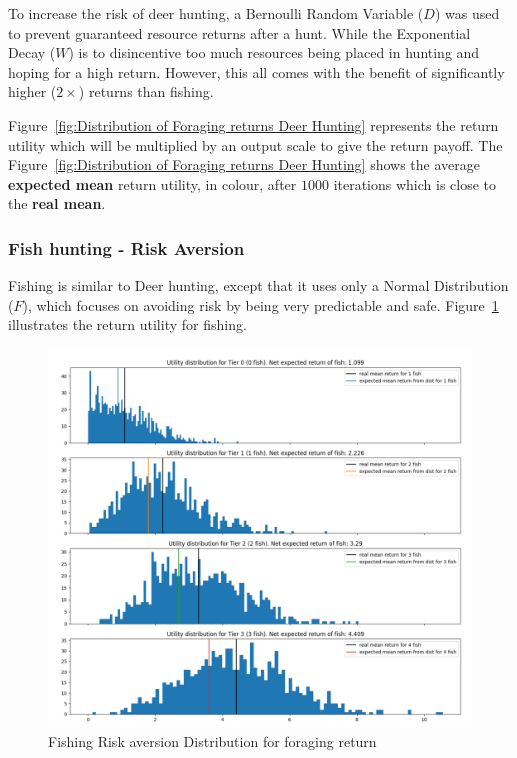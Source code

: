 To increase the risk of deer hunting, a Bernoulli Random Variable ($D$) was used to prevent guaranteed resource returns after a hunt. While the Exponential Decay ($W$) is to disincentive too much resources being placed in hunting and hoping for a high return. However, this all comes with the benefit of significantly higher ($2\times$) returns than fishing.

Figure~\ref{fig:Distribution of Foraging returns Deer Hunting} represents the return utility which will be multiplied by an output scale to give the return payoff. The Figure~\ref{fig:Distribution of Foraging returns Deer Hunting} shows the average \textbf{expected mean} return utility, in colour, after $1000$ iterations which is close to the \textbf{real mean}.

\newpage
\subsubsection{Fish hunting - Risk Aversion}

Fishing is similar to Deer hunting, except that it uses only a Normal Distribution ($F$), which focuses on avoiding risk by being very predictable and safe. Figure~\ref{fig:Distribution of Foraging returns Fishing} illustrates the return utility for fishing.

\begin{figure}[!htb]
    \centering
    \includegraphics[width=1\textwidth]{04_environment/images/Distribution of Foraging returns Fishing.PNG}
    \caption{Fishing Risk aversion Distribution for foraging return}
    \label{fig:Distribution of Foraging returns Fishing}
\end{figure}

